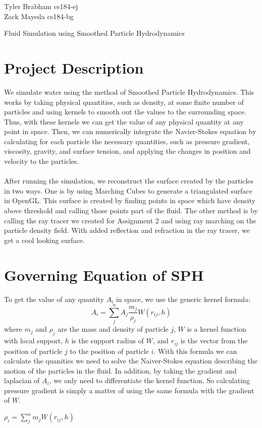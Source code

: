 \documentclass[12pt]{article}
\begin{document}
\begin{flushright}
\large
Tyler Brabham cs184-ej\\
Zack Mayeda cs184-bg
\end{flushright}

\begin{center}
\Large
Fluid Simulation using Smoothed Particle Hydrodynamics
\end{center}

\section*{Project Description}
We simulate water using the method of Smoothed Particle Hydrodynamics. This works by taking physical quantities, such as density, at some finite number of particles and using kernels to smooth out the values to the surrounding space. Thus, with these kernels we can get the value of any physical quantity at any point in space. Then, we can numerically integrate the Navier-Stokes equation by calculating for each particle the necessary quantities, such as pressure gradient, viscosity, gravity, and surface tension, and applying the changes in position and velocity to the particles.
\\ \\
After running the simulation, we reconstruct the surface created by the particles in two ways. One is by using Marching Cubes to generate a triangulated surface in OpenGL. This surface is created by finding points in space which have density above threshold and calling those points part of the fluid. The other method is by calling the ray tracer we created for Assignment 2 and using ray marching on the particle density field. With added reflection and refraction in the ray tracer, we get a cool looking surface.


\section*{Governing Equation of SPH}
To get the value of any quantity $A_{i}$ in space, we use the generic kernel formula: $$A_i = \sum_{j}^n A_j \frac{m_j}{\rho_j}W(r_{ij},h)$$
where $m_j$ and $\rho_j$ are the mass and density of particle $j$, $W$ is a kernel function with local support, $h$ is the support radius of $W$, and $r_{ij}$ is the vector from the position of particle $j$ to the position of particle $i$.
\newline
\newline
With this formula we can calculate the quanities we need to solve the Naiver-Stokes equation describing the motion of the particles in the fluid. In addition, by taking the gradient and laplacian of $A_i$, we only need to differentiate the kernel function. So calculating pressure gradient is simply a matter of using the same formula with the gradient of $W$.

\begin{center}
$\rho_i =  \sum_{j}^n m_j W(r_{ij},h)$
\newline

\end{center}
\end{document}

